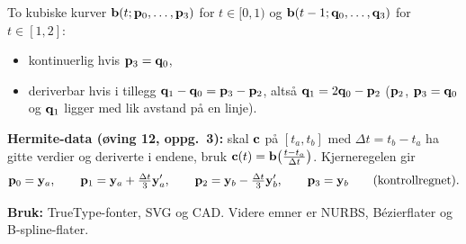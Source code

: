 \begin{teorem}
To kubiske kurver $\mathbf{b}(t;\mathbf{p}_0,\dots,\mathbf{p}_3)$ for $t\in[0,1)$ og $\mathbf{b}(t-1;\mathbf{q}_0,\dots,\mathbf{q}_3)$ for $t\in[1,2]$:
\begin{itemize}
  \item kontinuerlig hvis $\mathbf{p}_3=\mathbf{q}_0$,
  \item deriverbar hvis i tillegg $\mathbf{q}_1-\mathbf{q}_0=\mathbf{p}_3-\mathbf{p}_2$, altså $\mathbf{q}_1=2\mathbf{q}_0-\mathbf{p}_2$ ($\mathbf{p}_2$, $\mathbf{p}_3=\mathbf{q}_0$ og $\mathbf{q}_1$ ligger med lik avstand på en linje).
\end{itemize}
\textbf{Hermite-data (øving 12, oppg.~3):} skal $\mathbf{c}$ på $[t_a,t_b]$ med $\Delta t=t_b-t_a$ ha gitte verdier og deriverte i endene, bruk $\mathbf{c}(t)=\mathbf{b}\bigl(\frac{t-t_a}{\Delta t}\bigr)$. Kjerneregelen gir
\[
\mathbf{p}_0=\mathbf{y}_a,\qquad \mathbf{p}_1=\mathbf{y}_a+\tfrac{\Delta t}3\mathbf{y}_a',\qquad \mathbf{p}_2=\mathbf{y}_b-\tfrac{\Delta t}3\mathbf{y}_b',\qquad \mathbf{p}_3=\mathbf{y}_b\qquad\text{(kontrollregnet)}.
\]
\end{teorem}
\textbf{Bruk:} TrueType-fonter, SVG og CAD. Videre emner er NURBS, Bézierflater og B-spline-flater.



